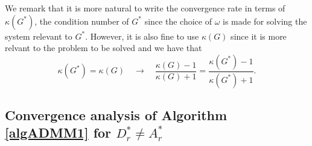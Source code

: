 \begin{itemize}
\begin{remark}
We remark that it is more natural to write the convergence rate in terms of $\kappa(G^*)$, the condition number of $G^*$ since the choice of $\omega$ is made for solving the system relevant to $G^*$. However, it is also fine to use $\kappa(G)$ since it is more relvant to the problem to be solved and we have that
\begin{equation}
\kappa(G^*) = \kappa(G) \quad \rightarrow \quad 
\frac{\kappa(G) - 1}{\kappa(G) + 1} = \frac{\kappa(G^*) - 1}{\kappa(G^*) + 1}. 
\end{equation}
\end{remark} 

\subsection{Convergence analysis of Algorithm \ref{algADMM1} for $D_r^* \neq A_r^*$}\label{gdn} 


\end{itemize}
